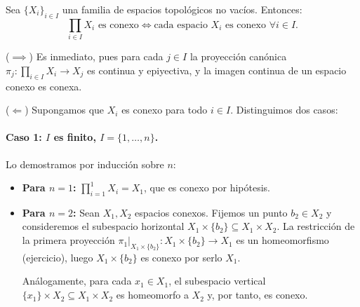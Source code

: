 \begin{teo}
    Sea $\{X_i\}_{i \in I}$ una familia de espacios topológicos no vacíos. Entonces:
    \[
        \prod_{i \in I} X_i \text{ es conexo} \iff \text{cada espacio } X_i \text{ es conexo } \forall i \in I \text{.}
    \]
\end{teo}

\begin{dem}
    ($\implies$) Es inmediato, pues para cada $j \in I$ la proyección canónica $\pi_j : \prod_{i \in I} X_i \to X_j$ es continua y epiyectiva, y la imagen continua de un espacio conexo es conexa.

    \medskip

    ($\Longleftarrow$) Supongamos que $X_i$ es conexo para todo $i \in I$. Distinguimos dos casos:

    \paragraph{Caso 1: $I$ es finito, $I = \{1, \dots, n\}$.} 
    Lo demostramos por inducción sobre $n$:
    \begin{itemize}
        \item \textbf{Para $n = 1$:} $\prod_{i=1}^1 X_i = X_1$, que es conexo por hipótesis.
        
        \item \textbf{Para $n = 2$:} Sean $X_1, X_2$ espacios conexos. Fijemos un punto $b_2 \in X_2$ y consideremos el subespacio horizontal $X_1 \times \{b_2\} \subseteq X_1 \times X_2$. La restricción de la primera proyección $\pi_1|_{X_1 \times \{b_2\}} : X_1 \times \{b_2\} \to X_1$ es un homeomorfismo (ejercicio), luego $X_1 \times \{b_2\}$ es conexo por serlo $X_1$.
        
        Análogamente, para cada $x_1 \in X_1$, el subespacio vertical $\{x_1\} \times X_2 \subseteq X_1 \times X_2$ es homeomorfo a $X_2$ y, por tanto, es conexo.
        
        \begin{center}
\end{center}
\end{itemize}
\end{dem}
